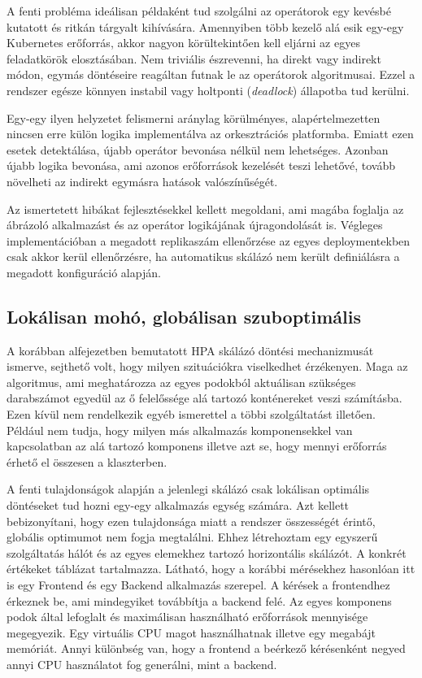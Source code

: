 A fenti probléma ideálisan példaként tud szolgálni az operátorok egy kevésbé kutatott és ritkán tárgyalt kihívására.
Amennyiben több kezelő alá esik egy-egy Kubernetes erőforrás, akkor nagyon körültekintően kell eljárni az egyes feladatkörök elosztásában.
Nem triviális észrevenni, ha direkt vagy indirekt módon, egymás döntéseire reagáltan futnak le az operátorok algoritmusai.
Ezzel a rendszer egésze könnyen instabil vagy holtponti (\textit{deadlock}) állapotba tud kerülni.

Egy-egy ilyen helyzetet felismerni aránylag körülményes, alapértelmezetten nincsen erre külön logika implementálva az orkesztrációs platformba.
Emiatt ezen esetek detektálása, újabb operátor bevonása nélkül nem lehetséges.
Azonban újabb logika bevonása, ami azonos erőforrások kezelését teszi lehetővé, tovább növelheti az indirekt egymásra hatások valószínűségét.

Az ismertetett hibákat fejlesztésekkel kellett megoldani, ami magába foglalja az ábrázoló alkalmazást és az operátor logikájának újragondolását is.
Végleges implementációban a megadott replikaszám ellenőrzése az egyes deploymentekben csak akkor kerül ellenőrzésre, ha automatikus skálázó nem került definiálásra a megadott konfiguráció alapján.

\subsection{Lokálisan mohó, globálisan szuboptimális}
\label{subsec:first-HPA-measure}

A korábban  alfejezetben bemutatott HPA skálázó döntési mechanizmusát ismerve, sejthető volt, hogy milyen szituációkra viselkedhet érzékenyen.
Maga az algoritmus, ami meghatározza az egyes podokból aktuálisan szükséges darabszámot egyedül az ő felelőssége alá tartozó konténereket veszi számításba.
Ezen kívül nem rendelkezik egyéb ismerettel a többi szolgáltatást illetően.
Például nem tudja, hogy milyen más alkalmazás komponensekkel van kapcsolatban az alá tartozó komponens illetve azt se, hogy mennyi erőforrás érhető el összesen a klaszterben.

A fenti tulajdonságok alapján a jelenlegi skálázó csak lokálisan optimális döntéseket tud hozni egy-egy alkalmazás egység számára.
Azt kellett bebizonyítani, hogy ezen tulajdonsága miatt a rendszer összességét érintő, globális optimumot nem fogja megtalálni.
Ehhez létrehoztam egy egyszerű szolgáltatás hálót és az egyes elemekhez tartozó horizontális skálázót. 
A konkrét értékeket  táblázat tartalmazza.
Látható, hogy a korábbi mérésekhez hasonlóan itt is egy Frontend és egy Backend alkalmazás szerepel. 
A kérések a frontendhez érkeznek be, ami mindegyiket továbbítja a backend felé. 
Az egyes komponens podok által lefoglalt és maximálisan használható erőforrások mennyisége megegyezik.
Egy virtuális CPU magot használhatnak illetve egy megabájt memóriát.
Annyi különbség van, hogy a frontend a beérkező kérésenként negyed annyi CPU használatot fog generálni, mint a backend.

